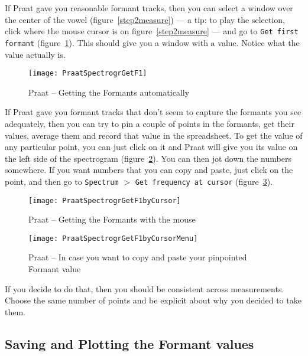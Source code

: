 \documentclass{article}
\newcommand{\soft}[1]{\textsf{#1}}
\newcommand{\softmenu}[1]{\texttt{#1}}
\newcommand{\Praat}{\soft{Praat}}
\begin{document}
If \Praat{} gave you reasonable formant tracks, then you can select a window over the center of the vowel (figure~\ref{step2measure}) --- a tip: to play the selection, click where the mouse cursor is on figure~\ref{step2measure} --- and go to \softmenu{Get first formant} (figure~\ref{step3measure}). This should give you a window with a value. Notice what the value actually is.

\begin{figure}[!tbp]
\caption{\Praat{} -- Getting the Formants automatically}
\label{step3measure}
	\begin{center}
		\texttt{[image: PraatSpectrogrGetF1]}
	\end{center}
\end{figure}


If \Praat{} gave you formant tracks that don't seem to capture the formants you see adequately, then you can try to pin a couple of points in the formants, get their values, average them and record that value in the spreadsheet. To get the value of any particular point, you can just click on it and \Praat{} will give you its value on the left side of the spectrogram (figure~\ref{step4measure}). You can then jot down the numbers somewhere. If you want numbers that you can copy and paste, just click on the point, and then go to \softmenu{Spectrum} $>$ \softmenu{Get frequency at cursor} (figure~\ref{step5measure}).

\begin{figure}[!tbp]
\caption{\Praat{} -- Getting the Formants with the mouse}
\label{step4measure}
	\begin{center}
		\texttt{[image: PraatSpectrogrGetF1byCursor]}
	\end{center}
\end{figure}

\begin{figure}[!tbp]
\caption{\Praat{} -- In case you want to copy and paste your pinpointed Formant value}
\label{step5measure}
	\begin{center}
		\texttt{[image: PraatSpectrogrGetF1byCursorMenu]}
	\end{center}
\end{figure}

If you decide to do that, then you should be consistent across measurements. Choose the same number of points and be explicit about why you decided to take them.  

\subsection{Saving and Plotting the Formant values}
\end{document}
